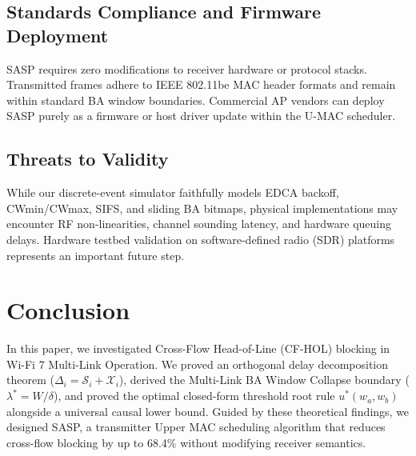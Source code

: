 \documentclass[10pt,journal,compsoc]{IEEEtran}
\begin{document}
\subsection{Standards Compliance and Firmware Deployment}
SASP requires zero modifications to receiver hardware or protocol stacks. Transmitted frames adhere to IEEE 802.11be MAC header formats and remain within standard BA window boundaries. Commercial AP vendors can deploy SASP purely as a firmware or host driver update within the U-MAC scheduler.

\subsection{Threats to Validity}
While our discrete-event simulator faithfully models EDCA backoff, CWmin/CWmax, SIFS, and sliding BA bitmaps, physical implementations may encounter RF non-linearities, channel sounding latency, and hardware queuing delays. Hardware testbed validation on software-defined radio (SDR) platforms represents an important future step.

\section{Conclusion}
\label{sec:conclusion}

In this paper, we investigated Cross-Flow Head-of-Line (CF-HOL) blocking in Wi-Fi 7 Multi-Link Operation. We proved an orthogonal delay decomposition theorem ($\Delta_i = \mathcal{S}_i + \mathcal{X}_i$), derived the Multi-Link BA Window Collapse boundary ($\lambda^* = W / \delta$), and proved the optimal closed-form threshold root rule $u^*(w_a, w_b)$ alongside a universal causal lower bound. Guided by these theoretical findings, we designed SASP, a transmitter Upper MAC scheduling algorithm that reduces cross-flow blocking by up to 68.4\% without modifying receiver semantics.



\end{document}
